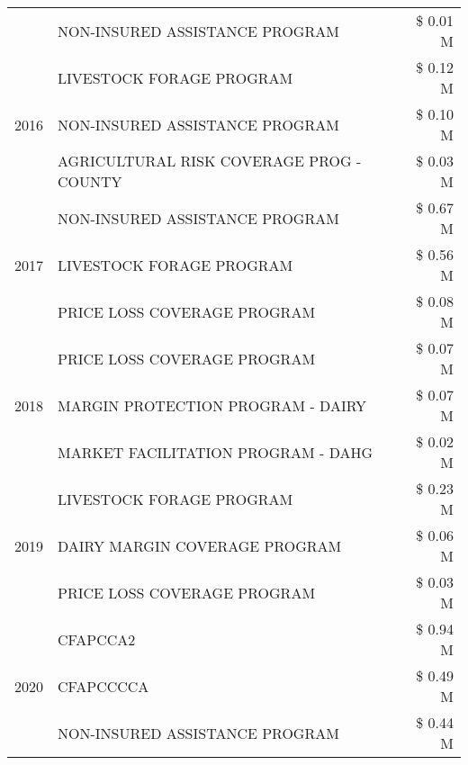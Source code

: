 \begin{tabular}{llr}
 & NON-INSURED ASSISTANCE PROGRAM & \$ 0.01 M \\
\cline{1-3}
\multirow[t]{3}{*}{2016} & LIVESTOCK FORAGE PROGRAM & \$ 0.12 M \\
 & NON-INSURED ASSISTANCE PROGRAM & \$ 0.10 M \\
 & AGRICULTURAL RISK COVERAGE PROG - COUNTY & \$ 0.03 M \\
\cline{1-3}
\multirow[t]{3}{*}{2017} & NON-INSURED ASSISTANCE PROGRAM & \$ 0.67 M \\
 & LIVESTOCK FORAGE PROGRAM & \$ 0.56 M \\
 & PRICE LOSS COVERAGE PROGRAM & \$ 0.08 M \\
\cline{1-3}
\multirow[t]{3}{*}{2018} & PRICE LOSS COVERAGE PROGRAM & \$ 0.07 M \\
 & MARGIN PROTECTION PROGRAM - DAIRY & \$ 0.07 M \\
 & MARKET FACILITATION PROGRAM - DAHG & \$ 0.02 M \\
\cline{1-3}
\multirow[t]{3}{*}{2019} & LIVESTOCK FORAGE PROGRAM & \$ 0.23 M \\
 & DAIRY MARGIN COVERAGE PROGRAM & \$ 0.06 M \\
 & PRICE LOSS COVERAGE PROGRAM & \$ 0.03 M \\
\cline{1-3}
\multirow[t]{3}{*}{2020} & CFAPCCA2 & \$ 0.94 M \\
 & CFAPCCCCA & \$ 0.49 M \\
 & NON-INSURED ASSISTANCE PROGRAM & \$ 0.44 M \\
\cline{1-3}
\bottomrule
\end{tabular}
